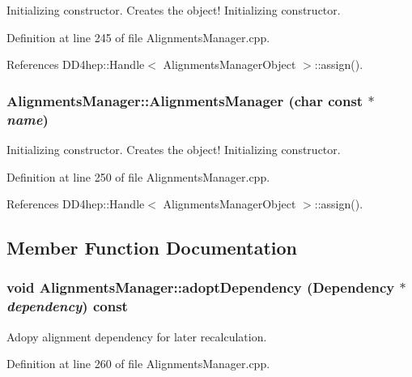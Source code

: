 Initializing constructor. Creates the object! Initializing constructor. 

Definition at line 245 of file AlignmentsManager.cpp.

References DD4hep::Handle$<$ AlignmentsManagerObject $>$::assign().\hypertarget{class_d_d4hep_1_1_alignments_1_1_alignments_manager_a7999f59e5ea1524757ff4ae11286d0b0}{
\subsubsection[{AlignmentsManager}]{\setlength{\rightskip}{0pt plus 5cm}AlignmentsManager::AlignmentsManager (char const $\ast$ {\em name})}}
\label{class_d_d4hep_1_1_alignments_1_1_alignments_manager_a7999f59e5ea1524757ff4ae11286d0b0}


Initializing constructor. Creates the object! Initializing constructor. 

Definition at line 250 of file AlignmentsManager.cpp.

References DD4hep::Handle$<$ AlignmentsManagerObject $>$::assign().

\subsection{Member Function Documentation}
\hypertarget{class_d_d4hep_1_1_alignments_1_1_alignments_manager_a15ebfa44e5c30c79175876e81b52bc9a}{
\subsubsection[{adoptDependency}]{\setlength{\rightskip}{0pt plus 5cm}void AlignmentsManager::adoptDependency ({\bf Dependency} $\ast$ {\em dependency}) const}}
\label{class_d_d4hep_1_1_alignments_1_1_alignments_manager_a15ebfa44e5c30c79175876e81b52bc9a}


Adopy alignment dependency for later recalculation. 

Definition at line 260 of file AlignmentsManager.cpp.

